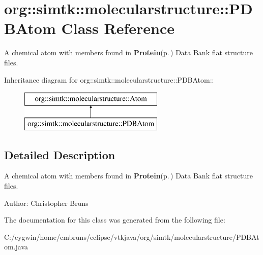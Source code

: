 \section{org::simtk::molecularstructure::PDBAtom Class Reference}
\label{classorg_1_1simtk_1_1molecularstructure_1_1_p_d_b_atom}
A chemical atom with members found in {\bf Protein}{\rm (p.\,\pageref{classorg_1_1simtk_1_1molecularstructure_1_1_protein})} Data Bank flat structure files.  


Inheritance diagram for org::simtk::molecularstructure::PDBAtom::\begin{figure}[H]
\begin{center}
\leavevmode
\includegraphics[height=2cm]{classorg_1_1simtk_1_1molecularstructure_1_1_p_d_b_atom}
\end{center}
\end{figure}


\subsection{Detailed Description}
A chemical atom with members found in {\bf Protein}{\rm (p.\,\pageref{classorg_1_1simtk_1_1molecularstructure_1_1_protein})} Data Bank flat structure files. 

\begin{Desc}
\item[Author:]Christopher Bruns \end{Desc}




The documentation for this class was generated from the following file:\begin{CompactItemize}
\item 
C:/cygwin/home/cmbruns/eclipse/vtkjava/org/simtk/molecularstructure/PDBAtom.java\end{CompactItemize}
